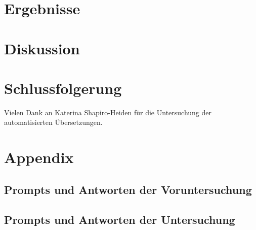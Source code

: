 \documentclass[acmlarge,authorversion,nonacm]{acmart}
\begin{document}
\section{Ergebnisse}\label{sec:results}


\section{Diskussion}\label{sec:discussion}


\section{Schlussfolgerung}\label{sec:conclusion}


\begin{acks}
Vielen Dank an Katerina Shapiro-Heiden für die Untersuchung der automatisierten Übersetzungen.
\end{acks}




\newpage
\appendix

\section{Appendix}

\subsection{Prompts und Antworten der Voruntersuchung}


\subsection{Prompts und Antworten der Untersuchung}
\end{document}
